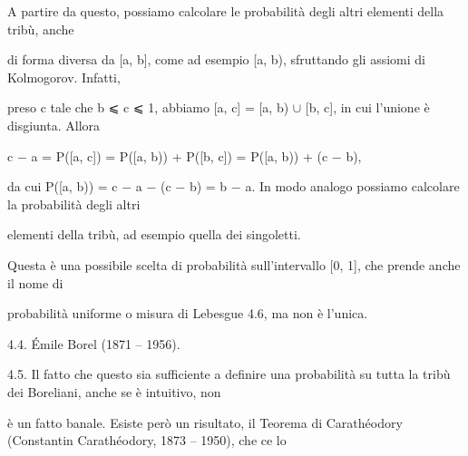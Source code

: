 \documentclass[a4paper,portrait,12pt]{article}
\begin{document}
\begin{flushleft}
A partire da questo, possiamo calcolare le probabilit\`{a} degli altri elementi della tribù, anche
\end{flushleft}


\begin{flushleft}
di forma diversa da [a, b], come ad esempio [a, b), sfruttando gli assiomi di Kolmogorov. Infatti,
\end{flushleft}


\begin{flushleft}
preso c tale che b ⩽ c ⩽ 1, abbiamo [a, c] = [a, b) $\cup$ [b, c], in cui l'unione \`{e} disgiunta. Allora
\end{flushleft}


\begin{flushleft}
c $-$ a = P([a, c]) = P([a, b)) + P([b, c]) = P([a, b)) + (c $-$ b),
\end{flushleft}


\begin{flushleft}
da cui P([a, b)) = c $-$ a $-$ (c $-$ b) = b $-$ a. In modo analogo possiamo calcolare la probabilit\`{a} degli altri
\end{flushleft}


\begin{flushleft}
elementi della tribù, ad esempio quella dei singoletti.
\end{flushleft}


\begin{flushleft}
Questa \`{e} una possibile scelta di probabilit\`{a} sull'intervallo [0, 1], che prende anche il nome di
\end{flushleft}


\begin{flushleft}
probabilit\`{a} uniforme o misura di Lebesgue 4.6, ma non \`{e} l'unica.
\end{flushleft}


\begin{flushleft}
4.4. \'{E}mile Borel (1871 -- 1956).
\end{flushleft}


\begin{flushleft}
4.5. Il fatto che questo sia sufficiente a definire una probabilit\`{a} su tutta la tribù dei Boreliani, anche se \`{e} intuitivo, non
\end{flushleft}


\begin{flushleft}
\`{e} un fatto banale. Esiste per\`{o} un risultato, il Teorema di Carath\'{e}odory (Constantin Carath\'{e}odory, 1873 -- 1950), che ce lo
\end{flushleft}
\end{document}
